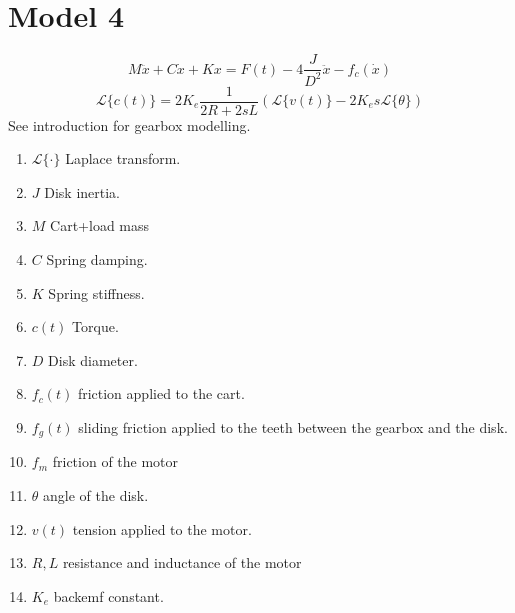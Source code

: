 \section{Model 4 }
$$M\ddot{x} + C\dot{x}+Kx = F(t) - 4\frac{J}{D^2}\ddot{x}- f_c(\dot{x})$$
$$\mathcal{L}\{c(t)\} = 2K_e \frac{1}{2R+2sL} (\mathcal{L}\{ v(t)\}-2K_e s \mathcal{L}\{\theta \})$$
See introduction for gearbox modelling.
\begin{enumerate}
\item $\mathcal{L}\{\cdot \}$ Laplace transform.
\item $J$ Disk inertia.
\item $M$ Cart+load mass
\item $C$ Spring damping.
\item $K$ Spring stiffness.
\item $c(t)$ Torque.
\item $D$ Disk diameter.
\item $f_c(t)$ friction applied to the cart.
\item $f_g(t)$ sliding friction applied to the teeth between the gearbox and the disk.
\item $f_m$ friction of the motor
\item $\theta$ angle of the disk.
\item $v(t)$ tension applied to the motor.
\item $R,L$ resistance and inductance of the motor
\item $K_e$ backemf constant.

\end{enumerate}

